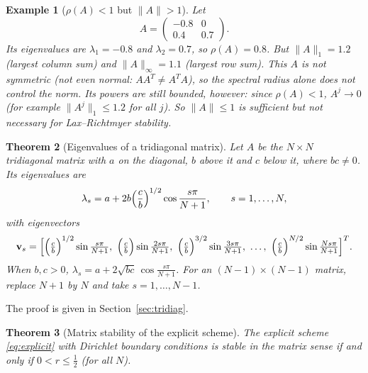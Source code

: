 \documentclass[11pt,a4paper]{article}
\numberwithin{equation}{section}
\theoremstyle{spacedplain}
\newtheorem{theorem}{Theorem}[section]
\theoremstyle{spaceddefinition}
\newtheorem{example}[theorem]{Example}
\theoremstyle{spacedremark}
\begin{document}
\begin{example}[\(\rho(A)<1\) but \(\|A\|>1\)]
Let
\[
  A=\begin{pmatrix}-0.8&0\\0.4&0.7\end{pmatrix}.
\]
Its eigenvalues are \(\lambda_1=-0.8\) and \(\lambda_2=0.7\), so
\(\rho(A)=0.8\).  But \(\|A\|_1=1.2\) (largest column sum) and
\(\|A\|_\infty=1.1\) (largest row sum).  This \(A\) is not symmetric
(not even normal: \(AA^T\ne A^TA\)), so the spectral radius alone does
not control the norm.  Its powers are
still bounded, however: since \(\rho(A)<1\), \(A^j\to0\) (for example
\(\|A^j\|_1\le1.2\) for all \(j\)).  So \(\|A\|\le1\) is sufficient but
not necessary for Lax--Richtmyer stability.
\end{example}

\begin{keybox}
\begin{theorem}[Eigenvalues of a tridiagonal matrix]\label{thm:tridiag}
Let \(A\) be the \(N\times N\) tridiagonal matrix with \(a\) on the
diagonal, \(b\) above it and \(c\) below it, where \(bc\ne0\).  Its
eigenvalues are
\[
  \lambda_s=a+2b\Bigl(\frac cb\Bigr)^{1/2}\cos\frac{s\pi}{N+1},
  \qquad s=1,\dots,N,
\]
with eigenvectors
\[
  \mathbf v_s
  =\Bigl[\Bigl(\tfrac cb\Bigr)^{1/2}\sin\tfrac{s\pi}{N+1},\
         \Bigl(\tfrac cb\Bigr)\sin\tfrac{2s\pi}{N+1},\
         \Bigl(\tfrac cb\Bigr)^{3/2}\sin\tfrac{3s\pi}{N+1},\
         \dots,\
         \Bigl(\tfrac cb\Bigr)^{N/2}\sin\tfrac{Ns\pi}{N+1}\Bigr]^T.
\]
When \(b,c>0\), \(\lambda_s=a+2\sqrt{bc}\,\cos\frac{s\pi}{N+1}\).  For an
\((N-1)\times(N-1)\) matrix, replace \(N+1\) by \(N\) and take
\(s=1,\dots,N-1\).
\end{theorem}
\end{keybox}

The proof is given in Section~\ref{sec:tridiag}.

\begin{keybox}
\begin{theorem}[Matrix stability of the explicit scheme]\label{thm:mexp}
The explicit scheme \eqref{eq:explicit} with Dirichlet boundary
conditions is stable in the matrix sense if and only if
\(0<r\le\frac12\) (for all \(N\)).
\end{theorem}
\end{keybox}
\end{document}
